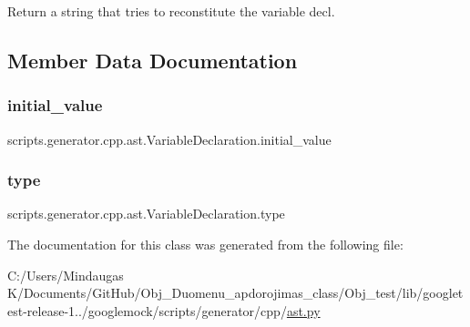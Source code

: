\begin{DoxyVerb}Return a string that tries to reconstitute the variable decl.\end{DoxyVerb}
 

\subsection{Member Data Documentation}
\mbox{\label{classscripts_1_1generator_1_1cpp_1_1ast_1_1_variable_declaration_aa79935e3c703c4cf5a542c1c7cf7a6a8}} 
\subsubsection{\texorpdfstring{initial\_value}{initial\_value}}
{\footnotesize\ttfamily scripts.\+generator.\+cpp.\+ast.\+Variable\+Declaration.\+initial\+\_\+value}

\mbox{\label{classscripts_1_1generator_1_1cpp_1_1ast_1_1_variable_declaration_a9efbfeeb6bb2d37f3c0a0f5b36f9f4a0}} 
\subsubsection{\texorpdfstring{type}{type}}
{\footnotesize\ttfamily scripts.\+generator.\+cpp.\+ast.\+Variable\+Declaration.\+type}



The documentation for this class was generated from the following file\+:\begin{DoxyCompactItemize}
\item 
C\+:/\+Users/\+Mindaugas K/\+Documents/\+Git\+Hub/\+Obj\+\_\+\+Duomenu\+\_\+apdorojimas\+\_\+class/\+Obj\+\_\+test/lib/googletest-\/release-\/1../googlemock/scripts/generator/cpp/\mbox{\hyperlink{_obj__test_2lib_2googletest-release-1_88_81_2googlemock_2scripts_2generator_2cpp_2ast_8py}{ast.\+py}}\end{DoxyCompactItemize}
